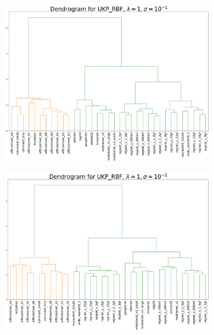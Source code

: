 \documentclass[11pt]{article}
\theoremstyle{plain}
\begin{document}
\begin{figure}[!h]
    \centering
    \begin{subfigure}[b]{0.45\textwidth}
        \includegraphics[width=\textwidth]{Appendix figures/imagenet_experiments/Dendogram final/Dendogram for UKP_dist_RBF_1.000000e+00_1.000000e-01.png}
    \end{subfigure}
    \hfill
    \begin{subfigure}[b]{0.45\textwidth}
        \includegraphics[width=\textwidth]{Appendix figures/imagenet_experiments/Dendogram final/Dendogram for UKP_dist_RBF_1.000000e+00_1.000000e-02.png}
    \end{subfigure}
    

\end{figure}
\end{document}
